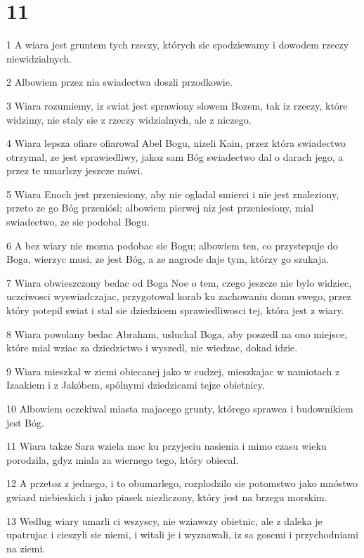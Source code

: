 \chapter{11}

\par 1 A wiara jest gruntem tych rzeczy, których sie spodziewamy i dowodem rzeczy niewidzialnych.
\par 2 Albowiem przez nia swiadectwa doszli przodkowie.
\par 3 Wiara rozumiemy, iz swiat jest sprawiony slowem Bozem, tak iz rzeczy, które widzimy, nie staly sie z rzeczy widzialnych, ale z niczego.
\par 4 Wiara lepsza ofiare ofiarowal Abel Bogu, nizeli Kain, przez która swiadectwo otrzymal, ze jest sprawiedliwy, jakoz sam Bóg swiadectwo dal o darach jego, a przez te umarlszy jeszcze mówi.
\par 5 Wiara Enoch jest przeniesiony, aby nie ogladal smierci i nie jest znaleziony, przeto ze go Bóg przeniósl; albowiem pierwej niz jest przeniesiony, mial swiadectwo, ze sie podobal Bogu.
\par 6 A bez wiary nie mozna podobac sie Bogu; albowiem ten, co przystepuje do Boga, wierzyc musi, ze jest Bóg, a ze nagrode daje tym, którzy go szukaja.
\par 7 Wiara obwieszczony bedac od Boga Noe o tem, czego jeszcze nie bylo widziec, uczciwosci wyswiadczajac, przygotowal korab ku zachowaniu domu swego, przez który potepil swiat i stal sie dziedzicem sprawiedliwosci tej, która jest z wiary.
\par 8 Wiara powolany bedac Abraham, usluchal Boga, aby poszedl na ono miejsce, które mial wziac za dziedzictwo i wyszedl, nie wiedzac, dokad idzie.
\par 9 Wiara mieszkal w ziemi obiecanej jako w cudzej, mieszkajac w namiotach z Izaakiem i z Jakóbem, spólnymi dziedzicami tejze obietnicy.
\par 10 Albowiem oczekiwal miasta majacego grunty, którego sprawca i budownikiem jest Bóg.
\par 11 Wiara takze Sara wziela moc ku przyjeciu nasienia i mimo czasu wieku porodzila, gdyz miala za wiernego tego, który obiecal.
\par 12 A przetoz z jednego, i to obumarlego, rozplodzilo sie potomstwo jako mnóstwo gwiazd niebieskich i jako piasek niezliczony, który jest na brzegu morskim.
\par 13 Wedlug wiary umarli ci wszyscy, nie wziawszy obietnic, ale z daleka je upatrujac i cieszyli sie niemi, i witali je i wyznawali, iz sa goscmi i przychodniami na ziemi.
